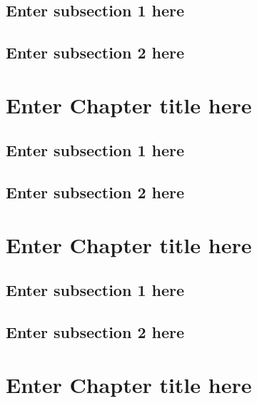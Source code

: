\documentclass[
]{book}
\begin{document}
\hypertarget{enter-subsection-1-here-5}{%
\section{Enter subsection 1 here}\label{enter-subsection-1-here-5}}

\hypertarget{enter-subsection-2-here-5}{%
\section{Enter subsection 2 here}\label{enter-subsection-2-here-5}}

\hypertarget{ch8}{%
\chapter{Enter Chapter title here}\label{ch8}}

\hypertarget{enter-subsection-1-here-6}{%
\section{Enter subsection 1 here}\label{enter-subsection-1-here-6}}

\hypertarget{enter-subsection-2-here-6}{%
\section{Enter subsection 2 here}\label{enter-subsection-2-here-6}}

\hypertarget{ch9}{%
\chapter{Enter Chapter title here}\label{ch9}}

\hypertarget{enter-subsection-1-here-7}{%
\section{Enter subsection 1 here}\label{enter-subsection-1-here-7}}

\hypertarget{enter-subsection-2-here-7}{%
\section{Enter subsection 2 here}\label{enter-subsection-2-here-7}}

\hypertarget{ch10}{%
\chapter{Enter Chapter title here}\label{ch10}}
\end{document}

